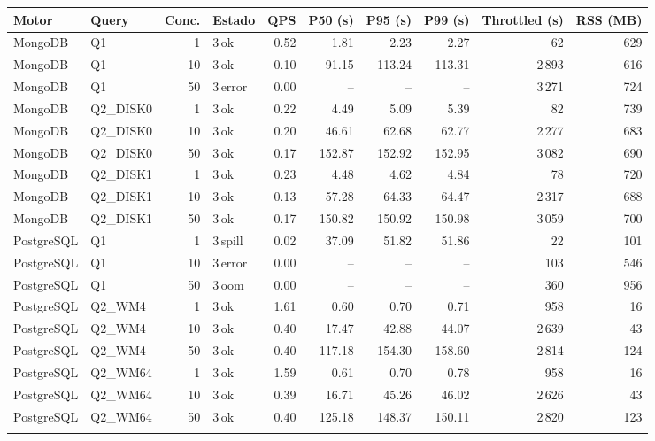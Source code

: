\begin{tabular}{llrlrrrrrr}
\toprule
Motor & Query & Conc. & Estado & QPS & P50 (s) & P95 (s) & P99 (s) & Throttled (s) & RSS (MB) \\
\midrule
MongoDB & Q1 & 1 & 3\,ok & 0.52 & 1.81 & 2.23 & 2.27 & 62 & 629 \\
MongoDB & Q1 & 10 & 3\,ok & 0.10 & 91.15 & 113.24 & 113.31 & 2\,893 & 616 \\
MongoDB & Q1 & 50 & 3\,error & 0.00 & -- & -- & -- & 3\,271 & 724 \\
\addlinespace[2pt]
MongoDB & Q2\_DISK0 & 1 & 3\,ok & 0.22 & 4.49 & 5.09 & 5.39 & 82 & 739 \\
MongoDB & Q2\_DISK0 & 10 & 3\,ok & 0.20 & 46.61 & 62.68 & 62.77 & 2\,277 & 683 \\
MongoDB & Q2\_DISK0 & 50 & 3\,ok & 0.17 & 152.87 & 152.92 & 152.95 & 3\,082 & 690 \\
\addlinespace[2pt]
MongoDB & Q2\_DISK1 & 1 & 3\,ok & 0.23 & 4.48 & 4.62 & 4.84 & 78 & 720 \\
MongoDB & Q2\_DISK1 & 10 & 3\,ok & 0.13 & 57.28 & 64.33 & 64.47 & 2\,317 & 688 \\
MongoDB & Q2\_DISK1 & 50 & 3\,ok & 0.17 & 150.82 & 150.92 & 150.98 & 3\,059 & 700 \\
\addlinespace[2pt]
\midrule
PostgreSQL & Q1 & 1 & 3\,spill & 0.02 & 37.09 & 51.82 & 51.86 & 22 & 101 \\
PostgreSQL & Q1 & 10 & 3\,error & 0.00 & -- & -- & -- & 103 & 546 \\
PostgreSQL & Q1 & 50 & 3\,oom & 0.00 & -- & -- & -- & 360 & 956 \\
\addlinespace[2pt]
PostgreSQL & Q2\_WM4 & 1 & 3\,ok & 1.61 & 0.60 & 0.70 & 0.71 & 958 & 16 \\
PostgreSQL & Q2\_WM4 & 10 & 3\,ok & 0.40 & 17.47 & 42.88 & 44.07 & 2\,639 & 43 \\
PostgreSQL & Q2\_WM4 & 50 & 3\,ok & 0.40 & 117.18 & 154.30 & 158.60 & 2\,814 & 124 \\
\addlinespace[2pt]
PostgreSQL & Q2\_WM64 & 1 & 3\,ok & 1.59 & 0.61 & 0.70 & 0.78 & 958 & 16 \\
PostgreSQL & Q2\_WM64 & 10 & 3\,ok & 0.39 & 16.71 & 45.26 & 46.02 & 2\,626 & 43 \\
PostgreSQL & Q2\_WM64 & 50 & 3\,ok & 0.40 & 125.18 & 148.37 & 150.11 & 2\,820 & 123 \\
\addlinespace[2pt]
\bottomrule
\end{tabular}
